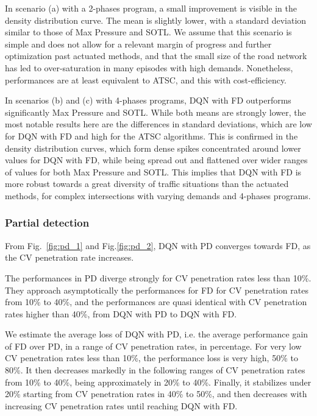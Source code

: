 \documentclass[journal]{IEEEtran}
\begin{document}
In scenario (a) with a 2-phases program, a small improvement is visible in the density distribution curve. The mean is slightly lower, with a standard deviation similar to those of Max Pressure and SOTL. We assume that this scenario is simple and does not allow for a relevant margin of progress and further optimization past actuated methods, and that the small size of the road network has led to over-saturation in many episodes with high demands. Nonetheless, performances are at least equivalent to ATSC, and this with cost-efficiency.

In scenarios (b) and (c) with 4-phases programs, DQN with FD outperforms significantly Max Pressure and SOTL. While both means are strongly lower, the most notable results here are the differences in standard deviations, which are low for DQN with FD and high for the ATSC algorithms. This is confirmed in the density distribution curves, which form dense spikes concentrated around lower values for DQN with FD, while being spread out and flattened over wider ranges of values for both Max Pressure and SOTL. This implies that DQN with FD is more robust towards a great diversity of traffic situations than the actuated methods, for complex intersections with varying demands and 4-phases programs.\\

\subsubsection{Partial detection}
From Fig.~\ref{fig:pd_1} and Fig.\ref{fig:pd_2}, DQN with PD converges towards FD, as the CV penetration rate increases. 

The performances in PD diverge strongly for CV penetration rates less than 10\%. They approach asymptotically the performances for FD for CV penetration rates from 10\% to 40\%, and the performances are quasi identical with CV penetration rates higher than 40\%, from DQN with PD to DQN with FD.

We estimate the average loss of DQN with PD, i.e. the average performance gain of FD over PD, in a range of CV penetration rates, in percentage. For very low CV penetration rates less than 10\%, the performance loss is very high, 50\% to 80\%. It then decreases markedly in the following ranges of CV penetration rates from 10\% to 40\%, being approximately in 20\% to 40\%. Finally, it stabilizes under 20\% starting from CV penetration rates in 40\% to 50\%, and then decreases with increasing CV penetration rates until reaching DQN with FD.
\end{document}

